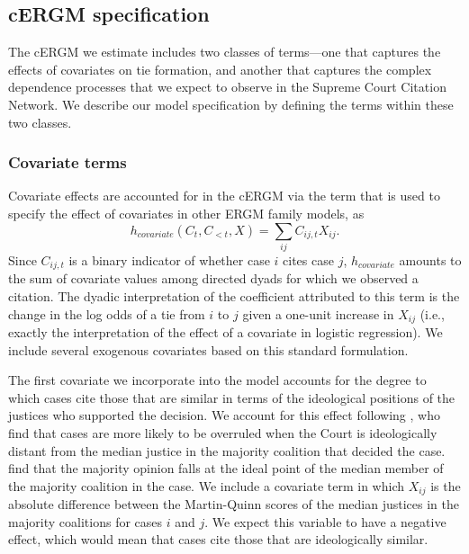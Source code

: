 \documentclass[headsepline=true, abstracton]{scrartcl}
\begin{document}
\subsection{cERGM specification}

The cERGM we estimate includes two classes of terms---one that captures the effects of covariates on tie formation, and another that captures the complex dependence processes that we expect to observe in the Supreme Court Citation Network. We describe our model specification by defining the terms within these two classes.


\subsubsection{Covariate terms}\label{covariate_terms}

Covariate effects are accounted for in the cERGM via the term that is used to specify the effect of covariates in other ERGM family models, as
$$h_{covariate}(C_t,C_{<t},X) =  \sum_{ij} C_{ij,t}X_{ij}.$$ Since $C_{ij,t}$ is a binary indicator of whether case $i$ cites case $j$, $h_{covariate}$ amounts to the sum of covariate values among directed dyads for which we observed a citation. The dyadic interpretation of the coefficient attributed to this term is the change in the log odds of a tie from $i$ to $j$ given a one-unit increase in $X_{ij}$ (i.e., exactly the interpretation of the effect of a covariate in logistic regression). We include several exogenous covariates based on this standard formulation. 

The first covariate we incorporate into the model accounts for the degree to which cases cite those that are similar in terms of the ideological positions of the justices who supported the decision. We account for this effect following \citet{spriggs2001explaining}, who find that cases are more likely to be overruled when the Court is ideologically distant from the median justice in the majority coalition that decided the case. \citet{clark2010locating} find that the majority opinion falls at the ideal point of the median member of the majority coalition in the case. We include a covariate term in which $X_{ij}$ is the absolute difference between the Martin-Quinn scores \citep{martin2002dynamic} of the median justices in the majority coalitions for cases $i$ and $j$. We expect this variable to have a negative effect, which would mean that cases cite those that are ideologically similar. %
\end{document}

